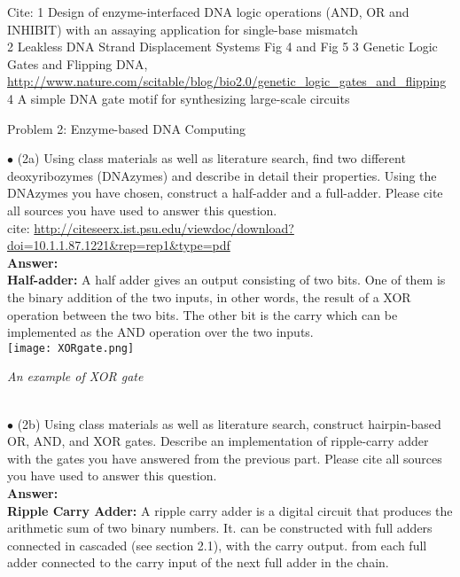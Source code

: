 \documentclass{article}
\begin{document}
Cite: 1 Design of enzyme-interfaced DNA logic operations (AND, OR and INHIBIT) with an assaying application for single-base mismatch \\
	  2 Leakless DNA Strand Displacement Systems Fig 4 and Fig 5
	  3 Genetic Logic Gates and Flipping DNA, \url{http://www.nature.com/scitable/blog/bio2.0/genetic_logic_gates_and_flipping}
	  4 A simple DNA gate motif for synthesizing large-scale circuits









\newpage
\centerline{\sc Problem 2: Enzyme-based DNA Computing}
\vspace{0.2in}
$\bullet$ (2a) Using class materials as well as literature search, find two different deoxyribozymes (DNAzymes) and describe in detail their properties. Using the DNAzymes you have chosen, construct a half-adder and a full-adder. Please cite all sources you have used to answer this question.\\

cite: \url{http://citeseerx.ist.psu.edu/viewdoc/download?doi=10.1.1.87.1221&rep=rep1&type=pdf}\\

\textbf{Answer:} \\
\textbf{Half-adder:} A half adder gives an output consisting of two bits. One of them is the binary addition of the two inputs, in other words, the result of a XOR operation between the two bits. The other
bit is the carry which can be implemented as the AND operation over the two inputs. \\
	\texttt{[image: XORgate.png]} \\
\centerline{\textit{An example of XOR gate} }\\

	
$\bullet$ (2b) Using class materials as well as literature search, construct hairpin-based OR, AND, and XOR gates. Describe an implementation of ripple-carry adder with the gates you have answered from the previous part. Please cite all sources you have used to answer this question. \\

\textbf{Answer:} \\
\textbf{Ripple Carry Adder:} A ripple carry adder is a digital circuit that produces the arithmetic sum of two binary numbers. It. can be constructed with full adders connected in cascaded (see section 2.1), with the carry output. from each full adder connected to the carry input of the next full adder in the chain. \\
\end{document}
